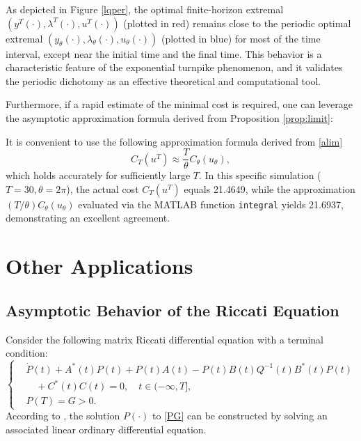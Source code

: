 \documentclass{IEEEtran}
\begin{document}
	As depicted in Figure \ref{lqper}, the optimal finite-horizon extremal $(y^T(\cdot),\lambda^T(\cdot),u^T(\cdot))$ (plotted in red) remains close to the periodic optimal extremal $(y_\theta(\cdot),\lambda_\theta(\cdot),u_\theta(\cdot))$ (plotted in blue) for most of the time interval, except near the initial time and the final time. This behavior is a characteristic feature of the exponential turnpike phenomenon, and it validates the periodic dichotomy as an effective theoretical and computational tool.
	
	Furthermore, if a rapid estimate of the minimal cost is required, one can leverage the asymptotic approximation formula derived from Proposition \ref{prop:limit}:
	
	It is convenient to use the following approximation formula derived from \eqref{alim}
	\begin{equation*}
		C_T(u^T) \approx  \frac{T}{\theta} C_\theta(u_\theta),
	\end{equation*}
	which holds accurately for sufficiently large $T$. In this specific simulation ($T=30, \theta=2\pi$), the actual cost $C_T(u^T)$ equals 21.4649, while the approximation $(T/\theta)C_\theta(u_\theta)$ evaluated via the MATLAB function \texttt{integral} yields 21.6937, demonstrating an excellent agreement.
	
	\section{Other Applications}\label{Ap3}
	\subsection{Asymptotic Behavior of the Riccati Equation}
	Consider the following matrix Riccati differential equation with a terminal condition:
	\begin{equation}\label{PG}
		\left\{
		\begin{aligned}
			&\dot{P}(t)+A^*(t)P(t)+P(t)A(t)-P(t)B(t)Q^{-1}(t)B^*(t)P(t)\\
			&\quad +C^*(t)C(t)=0,\quad t\in(-\infty,T],\\
			&P(T)=G>0.
		\end{aligned}
		\right.
	\end{equation}
	According to \cite[Theorem~19.9]{Poznyak08}, the solution $P(\cdot)$ to \eqref{PG} can be constructed by solving an associated linear ordinary differential equation.
	
\end{document}
